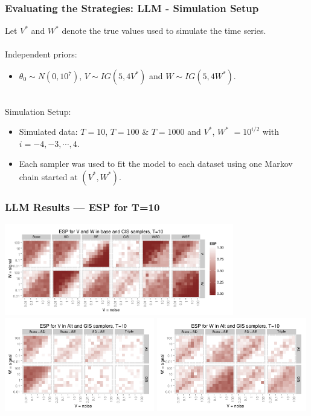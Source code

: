 \documentclass[xcolor=dvipsnames]{beamer}
\begin{document}
\begin{frame}
\frametitle{Evaluating the Strategies: LLM - Simulation Setup}

Let $V^*$ and $W^*$ denote the true values used to simulate the time series.\\~\\

Independent priors:
\begin{itemize}
\item $\theta_0\sim N(0, 10^7)$, $V\sim IG(5, 4V^*)$ and $W\sim IG(5, 4W^*)$.\\~\\
\end{itemize}

Simulation Setup:
\begin{itemize}
\item Simulated data: $T=10$, $T=100$ \& $T=1000$ and $V^*$, $W^*$ $=10^{i/2}$ with $i=-4,-3,\cdots,4$.
\item Each sampler was used to fit the model to each dataset using one Markov chain started at $(V^*,W^*)$.
\end{itemize}

\end{frame}


\begin{frame}
\frametitle{LLM Results --- ESP for T=10}
\centering
\includegraphics[width=0.75\textwidth]{basecisESplot10}\\
\includegraphics[width=0.49\textwidth]{altintESplotV10}
\includegraphics[width=0.49\textwidth]{altintESplotW10}
\end{frame}
\end{document}
